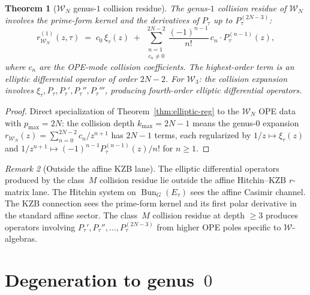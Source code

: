 \documentclass[11pt]{article}
\theoremstyle{plain}
\newtheorem{theorem}{Theorem}[section]
\theoremstyle{definition}
\theoremstyle{remark}
\newtheorem{remark}[theorem]{Remark}
\newcommand{\cW}{\mathcal{W}}
\DeclareMathOperator{\Bun}{Bun}
\numberwithin{equation}{section}
\begin{document}
\begin{theorem}[$\cW_N$ genus-$1$ collision
residue]\label{thm:wn-g1}
The genus-$1$ collision residue of $\cW_N$ involves the prime-form
kernel and the derivatives of \(P_\tau\) up to \(P_\tau^{(2N-3)}\):
\begin{equation}\label{eq:wn-genus1}
r_{\cW_N}^{(1)}(z,\tau)
\;=\;
c_0\,\xi_\tau(z)
\;+\;
\sum_{\substack{n=1 \\ c_n \neq 0}}^{2N-2}
\frac{(-1)^{n-1}}{n!}\,c_n\cdot P_\tau^{(n-1)}(z),
\end{equation}
where $c_n$ are the OPE-mode collision coefficients. The
highest-order term is an elliptic differential operator of order
$2N-2$. For $\cW_3$: the collision expansion involves
\(\xi_\tau,P_\tau,P_\tau',P_\tau'',P_\tau'''\), producing fourth-order elliptic
differential operators.
\end{theorem}

\begin{proof}
Direct specialization of Theorem~\ref{thm:elliptic-reg} to the
$\cW_N$ OPE data with $p_{\max} = 2N$: the collision depth
$k_{\max} = 2N-1$ means the genus-$0$ expansion
$r_{\cW_N}(z) = \sum_{n=0}^{2N-2}c_n/z^{n+1}$ has $2N-1$ terms,
each regularized by \(1/z\mapsto\xi_\tau(z)\) and
\(1/z^{n+1}\mapsto (-1)^{n-1}P_\tau^{(n-1)}(z)/n!\) for \(n \geq 1\).
\end{proof}

\begin{remark}[Outside the affine KZB lane]\label{rem:genuinely-new}
The elliptic differential operators produced by the class~$M$ collision
residue lie outside the affine Hitchin--KZB \(r\)-matrix lane. The
Hitchin system on $\Bun_G(E_\tau)$ sees the affine Casimir channel.
The KZB connection sees the prime-form kernel and its first polar
derivative in the standard affine sector. The class~$M$ collision
residue at depth $\geq 3$ produces operators involving
\(P_\tau',P_\tau'',\ldots,P_\tau^{(2N-3)}\) from higher OPE poles
specific to $\cW$-algebras.
\end{remark}



\section{Degeneration to genus~$0$}\label{sec:degeneration}
\end{document}
